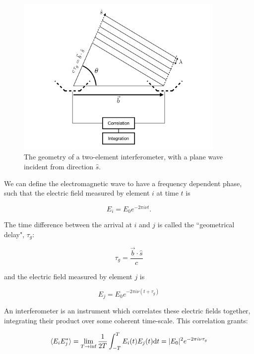 \begin{figure}
\centering
\includegraphics[width=0.9\textwidth]{chapters/interferometry/figures/visibility_explanation.pdf}
\caption{The geometry of a two-element interferometer, with a plane wave incident from direction $\hat{s}$.}
\label{fig:interferometry_2element}
\end{figure}

We can define the electromagnetic wave to have a frequency dependent phase, such that the electric field measured by element $i$ at time $t$ is

\begin{equation}
E_i = E_0 e^{-2\pi i \nu t}.
\end{equation}

The time difference between the arrival at $i$ and $j$ is called the ``geometrical delay", $\tau_g$:

\begin{equation}
\tau_g = \frac{\vec{b}\cdot\hat{s}}{c}
\end{equation}

and the electric field measured by element $j$ is

\begin{equation}
E_j = E_0 e^{-2\pi i \nu (t+\tau_g)}
\end{equation}

An interferometer is an instrument which correlates these electric fields together, integrating their product over some coherent time-scale. This correlation grants:

\begin{equation}
\langle E_i E_j^* \rangle 
= \lim_{T\rightarrow\inf}\frac{1}{2T}\int^T_{-T} E_i(t) E_j(t) {\rm d}t
= | E_0 |^2 e^{-2\pi i \nu \tau_g}
\end{equation}


